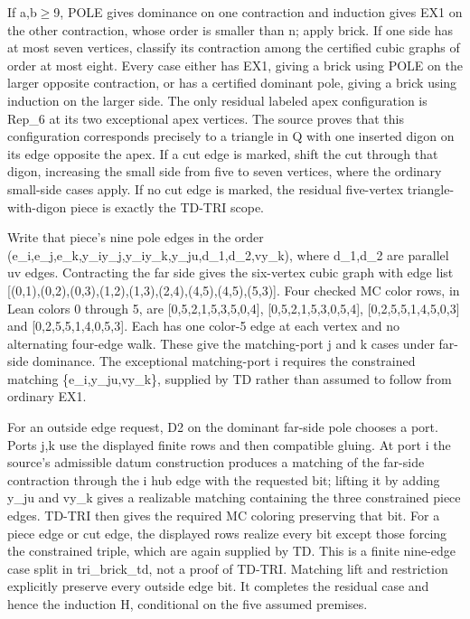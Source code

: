 \documentclass[11pt,a4paper]{article}
\begin{document}
If a,b\ensuremath{\geq}9, POLE gives dominance on one contraction and induction gives EX1 on the other contraction, whose order is smaller than n; apply brick. If one side has at most seven vertices, classify its contraction among the certified cubic graphs of order at most eight. Every case either has EX1, giving a brick using POLE on the larger opposite contraction, or has a certified dominant pole, giving a brick using induction on the larger side. The only residual labeled apex configuration is Rep\_6 at its two exceptional apex vertices. The source proves that this configuration corresponds precisely to a triangle in Q with one inserted digon on its edge opposite the apex. If a cut edge is marked, shift the cut through that digon, increasing the small side from five to seven vertices, where the ordinary small-side cases apply. If no cut edge is marked, the residual five-vertex triangle-with-digon piece is exactly the TD-TRI scope.

Write that piece's nine pole edges in the order (e\_i,e\_j,e\_k,y\_iy\_j,y\_iy\_k,y\_ju,d\_1,d\_2,vy\_k), where d\_1,d\_2 are parallel uv edges. Contracting the far side gives the six-vertex cubic graph with edge list [(0,1),(0,2),(0,3),(1,2),(1,3),(2,4),(4,5),(4,5),(5,3)]. Four checked MC color rows, in Lean colors 0 through 5, are [0,5,2,1,5,3,5,0,4], [0,5,2,1,5,3,0,5,4], [0,2,5,5,1,4,5,0,3] and [0,2,5,5,1,4,0,5,3]. Each has one color-5 edge at each vertex and no alternating four-edge walk. These give the matching-port j and k cases under far-side dominance. The exceptional matching-port i requires the constrained matching \{e\_i,y\_ju,vy\_k\}, supplied by TD rather than assumed to follow from ordinary EX1.

For an outside edge request, D2 on the dominant far-side pole chooses a port. Ports j,k use the displayed finite rows and then compatible gluing. At port i the source's admissible datum construction produces a matching of the far-side contraction through the i hub edge with the requested bit; lifting it by adding y\_ju and vy\_k gives a realizable matching containing the three constrained piece edges. TD-TRI then gives the required MC coloring preserving that bit. For a piece edge or cut edge, the displayed rows realize every bit except those forcing the constrained triple, which are again supplied by TD. This is a finite nine-edge case split in tri\_brick\_td, not a proof of TD-TRI. Matching lift and restriction explicitly preserve every outside edge bit. It completes the residual case and hence the induction H, conditional on the five assumed premises.
\end{document}
